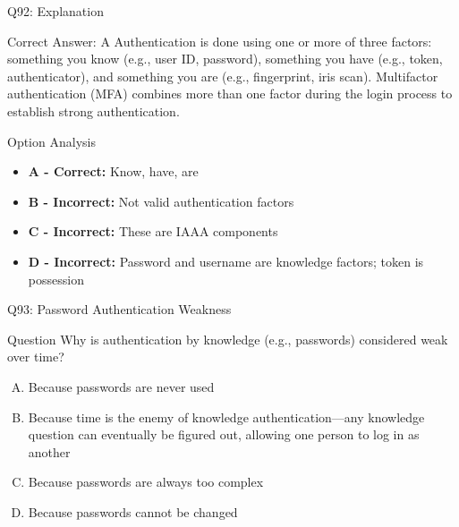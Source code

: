 \documentclass{beamer}
\begin{document}
	\begin{frame}{Q92: Explanation}
		\begin{block}{Correct Answer: A}
			Authentication is done using one or more of three factors: something you know (e.g., user ID, password), something you have (e.g., token, authenticator), and something you are (e.g., fingerprint, iris scan). Multifactor authentication (MFA) combines more than one factor during the login process to establish strong authentication.
		\end{block}
		\begin{block}{Option Analysis}
			\begin{itemize}
				\item \textbf{A - Correct:} Know, have, are
				\item \textbf{B - Incorrect:} Not valid authentication factors
				\item \textbf{C - Incorrect:} These are IAAA components
				\item \textbf{D - Incorrect:} Password and username are knowledge factors; token is possession
			\end{itemize}
		\end{block}
	\end{frame}
	
	\begin{frame}{Q93: Password Authentication Weakness}
		\begin{block}{Question}
			Why is authentication by knowledge (e.g., passwords) considered weak over time?
		\end{block}
		\begin{enumerate}[(A)]
			\item Because passwords are never used
			\item Because time is the enemy of knowledge authentication—any knowledge question can eventually be figured out, allowing one person to log in as another
			\item Because passwords are always too complex
			\item Because passwords cannot be changed
		\end{enumerate}
	\end{frame}
	
\end{document}
